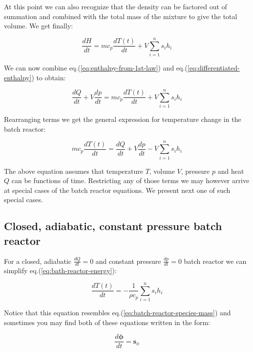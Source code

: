 \documentclass[10pt]{article}
\begin{document}
At this point we can also recognize that the density can be factored out of summation and combined with the total mass of the mixture to give the total volume. We get finally:

\begin{equation} \label{eq:differentiated-enthalpy}
\frac{dH}{dt} = m c_{p} \frac{d T(t)}{dt} + V \sum_{i=1}^n  s_i  h_i
\end{equation}

We can now combine eq.(\ref{eq:enthalpy-from-1st-law}) and eq.(\ref{eq:differentiated-enthalpy}) to obtain:

\begin{equation} 
\frac{dQ}{dt} + V \frac{dp}{dt} = m c_{p} \frac{d T(t)}{dt} + V \sum_{i=1}^n  s_i h_i
\end{equation}

Rearranging terms we get the general expression for temperature change in the batch reactor:

\begin{equation} \label{eq:bath-reactor-energy}
m c_{p} \frac{d T(t)}{dt}  = \frac{dQ}{dt} + V \frac{dp}{dt} - V \sum_{i=1}^n  s_i  h_i 
\end{equation}

The above equation assumes that temperature $T$, volume $V$, pressure $p$ and heat $Q$ can be functions of time. Restricting any of those terms we may however arrive at special cases of the batch reactor equations. We present next one of such special cases.


\newpage

\subsection{Closed, adiabatic, constant pressure batch reactor}

For a closed, adiabatic $\frac{dQ}{dt} = 0$ and constant pressure $\frac{dp}{dt}= 0$ batch reactor we can simplify eq.(\ref{eq:bath-reactor-energy}):

\begin{equation} \label{eq:bath-reactor-adiabatic-constant-pressure}
 \frac{d T(t)}{dt}  = - \frac{1}{\rho c_{p}} \sum_{i=1}^n  s_i  h_i 
\end{equation}

Notice that this equation resembles eq.(\ref{eq:batch-reactor-species-mass}) and sometimes you may find both of these equations written in the form:

\begin{equation} \label{eq:bath-reactor-adiabatic-constant-pressure}
 \frac{d \boldsymbol{\phi}}{dt}  = \mathbf{s}_{\phi}
\end{equation}
\end{document}
